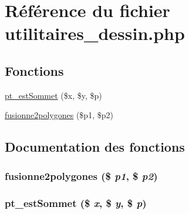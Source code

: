 \hypertarget{utilitaires__dessin_8php}{
\section{R\'{e}f\'{e}rence du fichier utilitaires\_\-dessin.php}
\label{utilitaires__dessin_8php}
}
\subsection*{Fonctions}
\begin{CompactItemize}
\item 
\hyperlink{utilitaires__dessin_8php_a0}{pt\_\-est\-Sommet} (\$x, \$y, \$p)
\item 
\hyperlink{utilitaires__dessin_8php_a1}{fusionne2polygones} (\$p1, \$p2)
\end{CompactItemize}


\subsection{Documentation des fonctions}
\hypertarget{utilitaires__dessin_8php_a1}{
\subsubsection[fusionne2polygones]{\setlength{\rightskip}{0pt plus 5cm}fusionne2polygones (\$ {\em p1}, \$ {\em p2})}}
\label{utilitaires__dessin_8php_a1}


\hypertarget{utilitaires__dessin_8php_a0}{
\subsubsection[pt\_\-estSommet]{\setlength{\rightskip}{0pt plus 5cm}pt\_\-est\-Sommet (\$ {\em x}, \$ {\em y}, \$ {\em p})}}
\label{utilitaires__dessin_8php_a0}



